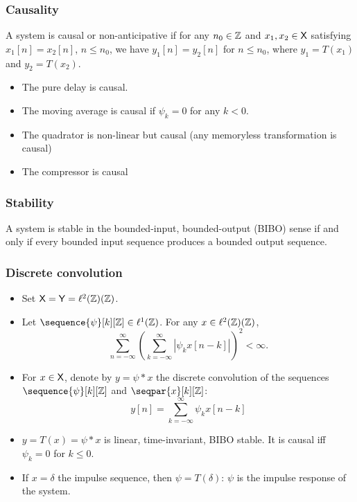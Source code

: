 \begin{frame}
\frametitle{Causality}
\begin{definition}
A system is \alert{causal} or \alert{non-anticipative} if for any $n_0 \in \mathbb{Z}$ and $x_1, x_2 \in \mathsf{X}$ satisfying $x_1[n]= x_2[n]$, $n \leq n_0$, we have $y_1[n]= y_2[n]$ for $n \leq n_0$, where $y_1= T(x_1)$ and $y_2= T(x_2)$.
\end{definition} 
\begin{itemize}
\item The pure delay is causal.
\item The moving average is causal if $\psi_k=0$ for any $k < 0$.
\item The quadrator is non-linear but causal (any memoryless transformation is causal)
\item The compressor is causal
\end{itemize}
\end{frame}

\begin{frame}
\frametitle{Stability}
\begin{definition}[Stability]
A system is stable in the bounded-input, bounded-output (BIBO) sense if and only if every bounded input sequence produces a bounded output sequence.
\end{definition}
\end{frame}

\begin{frame}
\frametitle{Discrete convolution}
\begin{itemize}
\item Set $\mathsf{X}= \mathsf{Y}= \ell^2(\mathbb{Z})(\mathbb{Z})$.
\item Let $\sequence{\psi}[k][\zset] \in \plone$. For any $x \in \ell^2(\mathbb{Z})(\mathbb{Z})$, 
\[
\sum_{n=-\infty}^{\infty} \left( \sum_{k=-\infty}^{\infty} |\psi_k x[n-k]| \right)^2 < \infty. 
\]
\item For $x \in \mathsf{X}$, denote by $y = \psi * x$ the \alert{discrete convolution} of the sequences $\sequence{\psi}[k][\zset]$ and $\seqpar{x}[k][\zset]$:
\[
y[n]= \sum_{k=-\infty}^{\infty} \psi_k x[n-k]
\]
\item $y= T(x)= \psi * x$ is linear, time-invariant, BIBO stable. It is causal iff $\psi_k= 0$ for $k \leq 0$.
\item If $x= \delta$ the \alert{impulse sequence}, then $\psi= T(\delta)$: $\psi$ is the \alert{impulse response} of the system. 
\end{itemize}
\end{frame}

